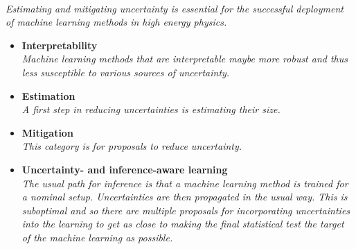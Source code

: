 \documentclass[12pt,letterpaper]{article}
\begin{document}
\begin{itemize}
\\\textit{Estimating and mitigating uncertainty is essential for the successful deployment of machine learning methods in high energy physics. }
	\begin{itemize}
		\item \textbf{Interpretability}~\cite{Gouskos:2026ydu,Lin:2026sch,Rai:2026uzm,Patel:2026zbq,Samal:2026bvr,Araz:2025vuw,Islam:2025kjf,Lv:2025nvq,Voetberg:2025fix,Vent:2025ddm,Erdmann:2025xpm,Chung:2025zib,Larkoski:2025clo,Kriesten:2024are,Gavrikov:2024rso,Wilkinson:2024xva,Ngairangbam:2023cps,Mengel:2023mnw,Barman:2023hbs,Roy:2022gge,Khot:2022aky,Grojean:2022mef,Anzalone:2022hrt,Bradshaw:2022qev,Mokhtar:2021bkf,Collins:2021pld,Romero:2021qlf,Grojean:2020ech,Agarwal:2020fpt,Diefenbacher:2019ezd,Chang:2017kvc,deOliveira:2015xxd}
		\\\textit{Machine learning methods that are interpretable maybe more robust and thus less susceptible to various sources of uncertainty.}
		\item \textbf{Estimation}~\cite{Araz:2026img,Diefenbacher:2026kki,Haussmann:2026gbi,Flek:2026vof,Bechtle:2026nlc,Bahl:2026qaf,Araz:2025vuw,Romero:2025rck,Keller:2025bac,Peron:2025mtj,Benevedes:2025nzr,Desai:2025mpy,Elsharkawy:2025yeb,Khot:2025kqg,Kriesten:2024ist,Panahi:2024sfb,Bieringer:2024nbc,Dickinson:2023yes,Golutvin:2023fle,Koh:2023wst,Cheung:2022dil,Bellagente:2021yyh,Barnard:2016qma,Nachman:2019yfl,Nachman:2019dol}
		\\\textit{A first step in reducing uncertainties is estimating their size.}
		\item \textbf{Mitigation}~\cite{Alvarez:2026umb,SuperCDMS:2025ywe,Azakli:2025yfb,Stein:2022nvf,Araz:2021wqm,Louppe:2016ylz,Englert:2018cfo,Estrade:DLPS2017}
		\\\textit{This category is for proposals to reduce uncertainty.}
		\item \textbf{Uncertainty- and inference-aware learning}~\cite{Morales:2026qax,Valsecchi:2026kpp,Mohr:2026etm,Aboelela:2025avp,Zhu:2025uyn,Flek:2025srm,Chakkappai:2025noy,Butter:2025wxn,He:2025vmh,Grossi:2025pmm,Frohnert:2025usi,Elsharkawy:2025six,Benato:2025rgo,CMS:2025cwy,Grosso:2025kmt,Layer:2023lwi,Simpson:2022suz,Abudinen:2021qpc,Ghosh:2021roe,Wunsch:2020iuh,deCastro:2018mgh,Bollweg:2019skg,Caron:2019xkx,DAgnolo:2018cun}
		\\\textit{The usual path for inference is that a machine learning method is trained for a nominal setup.  Uncertainties are then propagated in the usual way.  This is suboptimal and so there  are multiple proposals for incorporating uncertainties into the learning to get as close to making the final statistical test the target of the machine learning as possible.}

\end{itemize}
\end{itemize}
\end{document}
